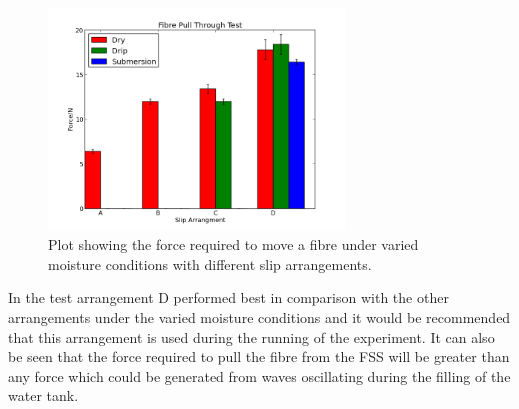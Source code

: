 \begin{figure}[h]
    \centering
    \includegraphics[width=0.7\textwidth]{Figures/FPTT_plot.png}
    \caption{Plot showing the force required to move a fibre under varied moisture conditions with different slip arrangements.}
    \label{fig:FPTT_plot}
\end{figure}

In the test arrangement D performed best in comparison with the other arrangements under the varied moisture conditions and it would be recommended that this arrangement is used during the running of the experiment. It can also be seen that the force required to pull the fibre from the FSS will be greater than any force which could be generated from waves oscillating during the filling of the water tank. 
